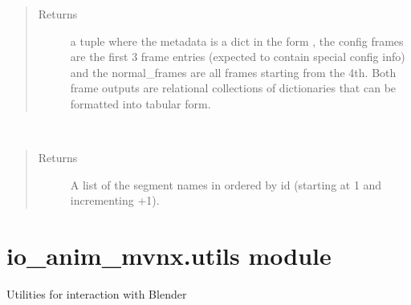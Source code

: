 \documentclass[letterpaper,10pt,english,openany,oneside]{sphinxmanual}
\begin{document}
\begin{fulllineitems}
\begin{fulllineitems}
\begin{quote}
\begin{description}
\item[{Returns}] \leavevmode
a tuple 
where the metadata is a dict in the form , the config frames are the
first 3 frame entries (expected to contain special config info)
and the normal\_frames are all frames starting from the 4th. Both
frame outputs are relational collections of dictionaries that can be
formatted into tabular form.

\end{description}\end{quote}

\end{fulllineitems}


\begin{fulllineitems}
\label{\detokenize{io_anim_mvnx:io_anim_mvnx.mvnx.Mvnx.extract_segments}}~\begin{quote}\begin{description}
\item[{Returns}] \leavevmode
A list of the segment names in 
ordered by id (starting at 1 and incrementing +1).

\end{description}\end{quote}

\end{fulllineitems}


\end{fulllineitems}



\section{io\_anim\_mvnx.utils module}
\label{\detokenize{io_anim_mvnx:module-io_anim_mvnx.utils}}\label{\detokenize{io_anim_mvnx:io-anim-mvnx-utils-module}}
Utilities for interaction with Blender
\end{document}
